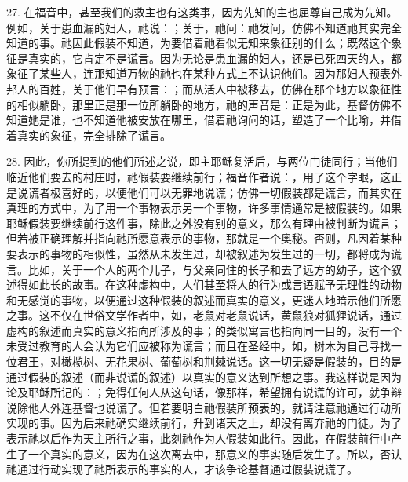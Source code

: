 27. 在福音中，甚至我们的救主也有这类事，因为先知的主也屈尊自己成为先知。例如，关于患血漏的妇人，祂说：；关于，祂问：祂发问，仿佛不知道祂其实完全知道的事。祂因此假装不知道，为要借着祂看似无知来象征别的什么；既然这个象征是真实的，它肯定不是谎言。因为无论是患血漏的妇人，还是已死四天的人，都象征了某些人，连那知道万物的祂也在某种方式上不认识他们。因为那妇人预表外邦人的百姓，关于他们早有预言：；而从活人中被移去，仿佛在那个地方以象征性的相似躺卧，那里正是那一位所躺卧的地方，祂的声音是：正是为此，基督仿佛不知道她是谁，也不知道他被安放在哪里，借着祂询问的话，塑造了一个比喻，并借着真实的象征，完全排除了谎言。\par

28. 因此，你所提到的他们所述之说，即主耶稣复活后，与两位门徒同行；当他们临近他们要去的村庄时，祂假装要继续前行；福音作者说：，用了这个字眼，这正是说谎者极喜好的，以便他们可以无罪地说谎；仿佛一切假装都是谎言，而其实在真理的方式中，为了用一个事物表示另一个事物，许多事情通常是被假装的。如果耶稣假装要继续前行这件事，除此之外没有别的意义，那么有理由被判断为谎言；但若被正确理解并指向祂所愿意表示的事物，那就是一个奥秘。否则，凡因着某种要表示的事物的相似性，虽然从未发生过，却被叙述为发生过的一切，都将成为谎言。比如，关于一个人的两个儿子，与父亲同住的长子和去了远方的幼子，这个叙述得如此长的故事。在这种虚构中，人们甚至将人的行为或言语赋予无理性的动物和无感觉的事物，以便通过这种假装的叙述而真实的意义，更迷人地暗示他们所愿之事。这不仅在世俗文学作者中，如，老鼠对老鼠说话，黄鼠狼对狐狸说话，通过虚构的叙述而真实的意义指向所涉及的事；的类似寓言也指向同一目的，没有一个未受过教育的人会认为它们应被称为谎言；而且在圣经中，如，树木为自己寻找一位君王，对橄榄树、无花果树、葡萄树和荆棘说话。这一切无疑是假装的，目的是通过假装的叙述（而非说谎的叙述）以真实的意义达到所想之事。我这样说是因为论及耶稣所记的：；免得任何人从这句话，像那样，希望拥有说谎的许可，就争辩说除他人外连基督也说谎了。但若要明白祂假装所预表的，就请注意祂通过行动所实现的事。因为后来祂确实继续前行，升到诸天之上，却没有离弃祂的门徒。为了表示祂以后作为天主所行之事，此刻祂作为人假装如此行。因此，在假装前行中产生了一个真实的意义，因为在这次离去中，那意义的事实随后发生了。所以，否认祂通过行动实现了祂所表示的事实的人，才该争论基督通过假装说谎了。\par


